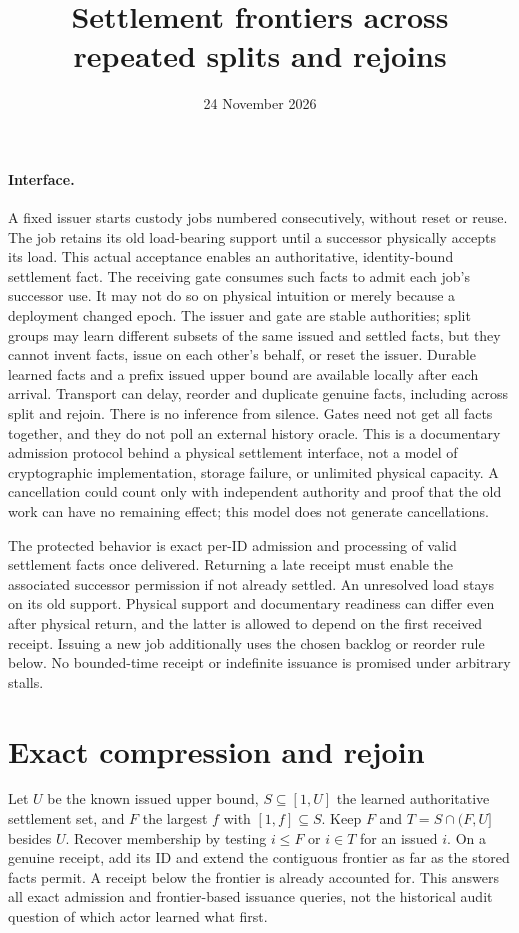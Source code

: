 \documentclass[11pt]{article}
\title{Settlement frontiers across repeated splits and rejoins}
\author{}
\date{24 November 2026}
\begin{document}
\maketitle

\paragraph{Interface.}
A fixed issuer starts custody jobs numbered consecutively, without reset or reuse. The job retains its old load-bearing support until a successor physically accepts its load. This actual acceptance enables an authoritative, identity-bound settlement fact. The receiving gate consumes such facts to admit each job's successor use. It may not do so on physical intuition or merely because a deployment changed epoch. The issuer and gate are stable authorities; split groups may learn different subsets of the same issued and settled facts, but they cannot invent facts, issue on each other's behalf, or reset the issuer. Durable learned facts and a prefix issued upper bound are available locally after each arrival. Transport can delay, reorder and duplicate genuine facts, including across split and rejoin. There is no inference from silence. Gates need not get all facts together, and they do not poll an external history oracle. This is a documentary admission protocol behind a physical settlement interface, not a model of cryptographic implementation, storage failure, or unlimited physical capacity. A cancellation could count only with independent authority and proof that the old work can have no remaining effect; this model does not generate cancellations.

The protected behavior is exact per-ID admission and processing of valid settlement facts once delivered. Returning a late receipt must enable the associated successor permission if not already settled. An unresolved load stays on its old support. Physical support and documentary readiness can differ even after physical return, and the latter is allowed to depend on the first received receipt. Issuing a new job additionally uses the chosen backlog or reorder rule below. No bounded-time receipt or indefinite issuance is promised under arbitrary stalls.

\section{Exact compression and rejoin}
Let $U$ be the known issued upper bound, $S\subseteq[1,U]$ the learned authoritative settlement set, and $F$ the largest $f$ with $[1,f]\subseteq S$. Keep $F$ and $T=S\cap(F,U]$ besides $U$. Recover membership by testing $i\le F$ or $i\in T$ for an issued $i$. On a genuine receipt, add its ID and extend the contiguous frontier as far as the stored facts permit. A receipt below the frontier is already accounted for. This answers all exact admission and frontier-based issuance queries, not the historical audit question of which actor learned what first.
\end{document}
